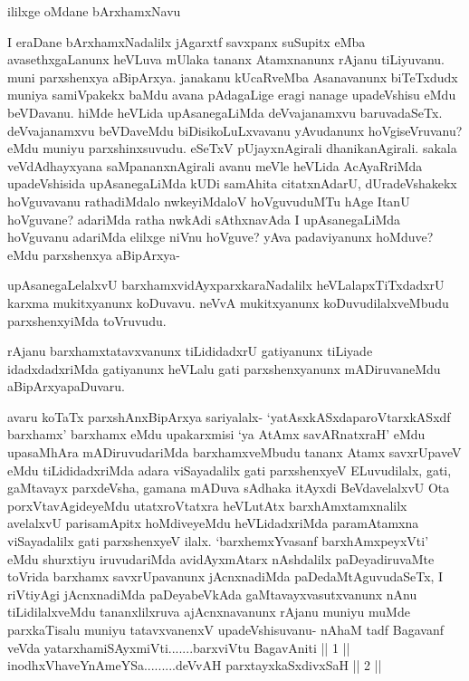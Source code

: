 \begin{center}
ililxge oMdane bArxhamxNavu
\end{center}


\begin{artha}
I eraDane bArxhamxNadalilx jAgarxtf savxpanx suSupitx eMba avasethxgaLanunx heVLuva mUlaka tananx Atamxnanunx rAjanu tiLiyuvanu. muni parxshenxya aBipArxya. janakanu kUcaRveMba Asanavanunx biTeTxdudx muniya samiVpakekx baMdu avana pAdagaLige eragi nanage upadeVshisu eMdu beVDavanu. hiMde heVLida upAsanegaLiMda deVvajanamxvu baruvadaSeTx. deVvajanamxvu beVDaveMdu biDisikoLuLxvavanu yAvudanunx hoVgiseVruvanu? eMdu muniyu parxshinxsuvudu. eSeTxV pUjayxnAgirali dhanikanAgirali. sakala veVdAdhayxyana saMpananxnAgirali avanu meVle heVLida AcAyaRriMda upadeVshisida upAsanegaLiMda kUDi samAhita citatxnAdarU, dUradeVshakekx hoVguvavanu rathadiMdalo nwkeyiMdaloV hoVguvuduMTu hAge ItanU hoVguvane? adariMda ratha nwkAdi sAthxnavAda I upAsanegaLiMda hoVguvanu adariMda elilxge niVnu hoVguve? yAva padaviyanunx hoMduve? eMdu parxshenxya aBipArxya-
\end{artha}%

\begin{artha}
upAsanegaLelalxvU barxhamxvidAyxparxkaraNadalilx heVLalapxTiTxdadxrU karxma mukitxyanunx koDuvavu. neVvA mukitxyanunx koDuvudilalxveMbudu parxshenxyiMda toVruvudu. 
\end{artha}


\begin{artha}
rAjanu barxhamxtatavxvanunx tiLididadxrU gatiyanunx tiLiyade idadxdadxriMda gatiyanunx heVLalu gati parxshenxyanunx mADiruvaneMdu aBipArxyapaDuvaru. 
\end{artha}

\begin{artha}
avaru koTaTx parxshAnxBipArxya sariyalalx- `yatAsxkASxdaparoVtarxkASxdf barxhamx' barxhamx eMdu upakarxmisi `ya AtAmx savARnatxraH' eMdu upasaMhAra mADiruvudariMda barxhamxveMbudu tananx Atamx savxrUpaveV eMdu tiLididadxriMda adara viSayadalilx gati parxshenxyeV ELuvudilalx, gati, gaMtavayx parxdeVsha, gamana mADuva sAdhaka itAyxdi BeVdavelalxvU Ota porxVtavAgideyeMdu utatxroVtatxra heVLutAtx barxhAmxtamxnalilx avelalxvU parisamApitx hoMdiveyeMdu heVLidadxriMda paramAtamxna viSayadalilx gati parxshenxyeV ilalx. `barxhemxYvasanf barxhAmxpeyxVti' eMdu shurxtiyu iruvudariMda avidAyxmAtarx nAshdalilx paDeyadiruvaMte toVrida barxhamx savxrUpavanunx jAcnxnadiMda paDedaMtAguvudaSeTx, I riVtiyAgi jAcnxnadiMda paDeyabeVkAda gaMtavayxvasutxvanunx nAnu tiLidilalxveMdu tananxlilxruva ajAcnxnavanunx rAjanu muniyu muMde parxkaTisalu muniyu tatavxvanenxV upadeVshisuvanu-
nAhaM tadf Bagavanf veVda yatarxhamiSAyxmiVti.......barxviVtu BagavAniti || 1 || \\
inodhxVhaveYnAmeYSa.........deVvAH parxtayxkaSxdivxSaH || 2 ||
\end{artha}

